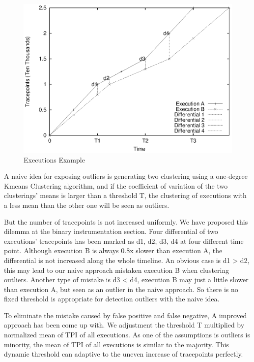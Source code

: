 \begin{figure}
\centering
\includegraphics[width=0.9\columnwidth, angle=-90]{figures/executions_example.eps}
\caption{Executions Example}
\label{figure:executionsexample}
\end{figure}

A naive idea for exposing outliers is generating two clustering using a one-degree Kmeans Clustering algorithm, and if the coefficient of variation of the two clusterings’ means is larger than a threshold T, the clustering of executions with a less mean than the other one  will be seen as outliers.

But the number of tracepoints is not increased uniformly. We have proposed this dilemma at the binary instrumentation section. Four differential of two executions’ tracepoints has been marked as d1, d2, d3, d4 at four different time point. Although execution B is always 0.8x slower than execution A, the differential is not increased along the whole timeline. An obvious case is d1 > d2, this may lead to our naive approach mistaken execution B when clustering outliers. Another type of mistake is d3 < d4, execution B may just a little slower than execution A, but seen as an outlier in the naive approach. So there is no fixed threshold is appropriate for detection outliers with the naive idea.

To eliminate  the mistake caused by false positive and false negative, A improved approach has been come up with. We adjustment the threshold T multiplied by normalized mean of TPI of all executions. As one of the assumptions is outliers is minority, the mean of TPI of all executions is similar to the majority. This dynamic threshold can adaptive to the uneven increase of tracepoints perfectly.

